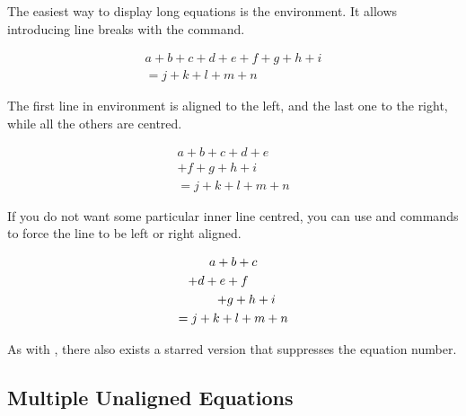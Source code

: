 The easiest way to display long equations is the  environment. It
allows introducing line breaks with the \csi{\bs} command.
\begin{example}
\begin{multline}
  a + b + c + d + e
  + f + g + h + i \\
  = j + k + l + m + n
\end{multline}
\end{example}
The first line in  environment is aligned to the left, and the last
one to the right, while all the others are centred.
\begin{example}
\begin{multline}
  a + b + c + d + e \\
  + f + g + h + i \\
  = j + k + l + m + n
\end{multline}
\end{example}

If you do not want some particular inner line centred, you can use
 and  commands to force the line to be left or
right aligned.
\begin{example}
\begin{multline}
  a + b + c \\
  \shoveleft{+ d + e + f} \\
  \shoveright{+ g + h + i} \\
  = j + k + l + m + n
\end{multline}
\end{example}

As with , there also exists a starred  version that
suppresses the equation number.

\subsection{Multiple Unaligned Equations}

